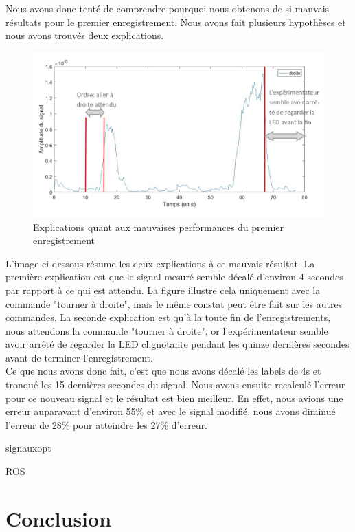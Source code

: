 \documentclass[11pt]{article}
\begin{document}
\cleardoublepage


Nous avons donc tenté de comprendre pourquoi nous obtenons de si mauvais résultats pour le premier enregistrement. Nous avons fait plusieurs hypothèses et nous avons trouvés deux explications. \\

\begin{figure}[!h]
	\includegraphics[scale=0.75]{images/herve001corect.jpg}
	\caption{Explications quant aux mauvaises performances du premier enregistrement}
	\label{fig:duck}
\end{figure}

L'image ci-dessous résume les deux explications à ce mauvais résultat. La première explication est que le signal mesuré semble décalé d'environ 4 secondes par rapport à ce qui est attendu. La figure illustre cela uniquement avec la commande "tourner à droite", mais le même constat peut être fait sur les autres commandes. La seconde explication est qu'à la toute fin de l'enregistrements, nous attendons la commande "tourner à droite", or l'expérimentateur semble avoir arrêté de regarder la LED clignotante pendant les quinze dernières secondes avant de terminer l'enregistrement. \\


Ce que nous avons donc fait, c'est que nous avons décalé les labels de 4s et tronqué les 15 dernières secondes du signal. Nous avons ensuite recalculé l'erreur pour ce nouveau signal et le résultat est bien meilleur. En effet, nous avions une erreur auparavant d'environ 55\% et avec le signal modifié, nous avons diminué l'erreur de 28\% pour atteindre les 27\% d'erreur.


{signauxopt}

\cleardoublepage


{ROS}
\cleardoublepage
\section{Conclusion}
\cleardoublepage
\end{document}
